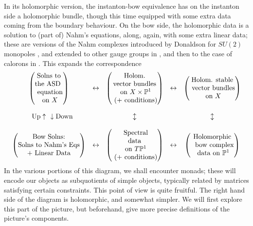 \documentclass[12pt]{article}
\theoremstyle{definition}
\theoremstyle{remark}
\numberwithin{theorem}{section}
\def\bP{{\mathbb {P}}}
\begin{document}
In its holomorphic version, the instanton-bow equivalence has on the  instanton side a holomorphic bundle, though this time equipped with some extra data coming from the boundary behaviour. On the bow side, the holomorphic data is a solution to (part of)  Nahm's equations, along, again, with some extra linear data; these are versions of the Nahm complexes introduced by Donaldson for $SU(2)$ monopoles \cite{Donaldson:1985id}, and extended to other gauge groups in \cite{Hurtubise:1989wh}, and then to the case of calorons in \cite{Charbonneau:2006gu}. This  expands the correspondence
$$\begin{matrix} \begin{pmatrix} \text{Solns to}\\ \text{the ASD }\\ \ \text{equation}\\ \ \text{on}\ X  \end{pmatrix} & \leftrightarrow & 
\begin{pmatrix} \text{Holom.}\\  \text{vector bundles} \\ \ \text{on}\ X\times \bP^1 \\ \ \text{(+\ conditions)}\end{pmatrix}& \leftrightarrow & 
\begin{pmatrix} \text{Holom. stable}\\ \ \text{vector bundles} \\ \ \text{on}\ X \end{pmatrix}\\ \\
\quad \text{Up}\uparrow\ \ \downarrow\text{Down}&& \updownarrow&&\updownarrow\\ \\
\begin{pmatrix} \text{Bow Solns:}\\ \text{Solns to Nahm's Eqs}\\ \text{+\ Linear Data} \end{pmatrix} & \leftrightarrow & \begin{pmatrix} {\rm \ Spectral }\\ \ {\rm data\  } \\ \ {\rm on\ }  T\bP^1 \\ \ {\rm (+\ conditions)}\end{pmatrix}& \leftrightarrow & \begin{pmatrix} {\rm \ Holomorphic\  }\\ \ {\rm \ bow \ complex} \\ \ {\rm data\ on\ \bP^1}\end{pmatrix}
\end{matrix}$$
In the various portions of this diagram, we shall encounter monads; these will encode our objects as subquotients of simple objects, typically related by  matrices satisfying certain constraints. This point of view \cite{Horrocks, ADHM,Nahm:1979yw,Nahm1983} is quite fruitful. The right hand side of the diagram is holomorphic, and somewhat simpler. We will first explore this part of the picture, but beforehand, give more precise definitions of the picture's components.  
\end{document}
